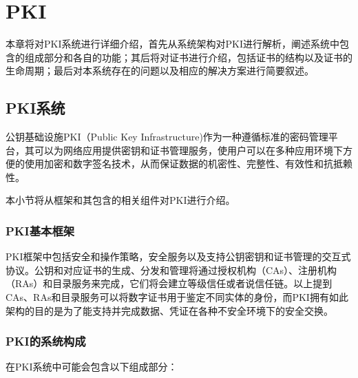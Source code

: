 
\chapter{PKI}

本章将对PKI系统进行详细介绍，首先从系统架构对PKI进行解析，阐述系统中包含的组成部分和各自的功能；其后将对证书进行介绍，包括证书的结构以及证书的生命周期；最后对本系统存在的问题以及相应的解决方案进行简要叙述。

\section{PKI系统}

公钥基础设施PKI（Public Key Infrastructure)作为一种遵循标准的密码管理平台，其可以为网络应用提供密钥和证书管理服务，使用户可以在多种应用环境下方便的使用加密和数字签名技术，从而保证数据的机密性、完整性、有效性和抗抵赖性。

本小节将从框架和其包含的相关组件对PKI进行介绍。

\subsection{PKI基本框架}

PKI框架中包括安全和操作策略，安全服务以及支持公钥密钥和证书管理的交互式协议。公钥和对应证书的生成、分发和管理将通过授权机构（CAs）、注册机构（RAs）和目录服务来完成\cite{weise2001public}，它们将会建立等级信任或者说信任链。以上提到CAs、RAs和目录服务可以将数字证书用于鉴定不同实体的身份，而PKI拥有如此架构的目的是为了能支持并完成数据、凭证在各种不安全环境下的安全交换。

\subsection{PKI的系统构成}

在PKI系统中可能会包含以下组成部分：

